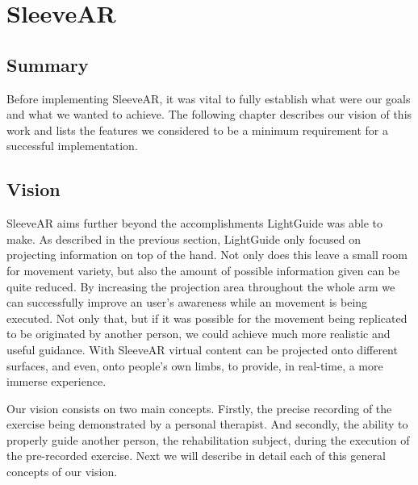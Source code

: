 \chapter{SleeveAR}
\label{sec:sleevear}

\section*{Summary}

Before implementing SleeveAR, it was vital to fully establish what were our goals and what we wanted to achieve. 
The following chapter describes our vision of this work and lists the features we considered to be a minimum requirement for a successful implementation.



\section{Vision}
\label{sec:sleevear:approach}


SleeveAR aims further beyond the accomplishments LightGuide was able to make. 
As described in the previous section, LightGuide only focused on projecting information on top of the hand. Not only does this leave a small room for movement variety, but also the amount of possible information given can be quite reduced.
By increasing the projection area throughout the whole arm we can successfully improve an user's awareness while an movement is being executed. 
Not only that, but if it was possible for the movement being replicated to be originated by another person, we could achieve much more realistic and useful guidance.
With SleeveAR virtual content can be projected onto different surfaces, and even, onto people's own limbs, to provide, in real-time, a more immerse experience. 

Our vision consists on two main concepts. Firstly, the precise recording of the exercise being demonstrated by a personal therapist. 
And secondly, the ability to properly guide another person, the rehabilitation subject, during the execution of the pre-recorded exercise.
Next we will describe in detail each of this general concepts of our vision.


